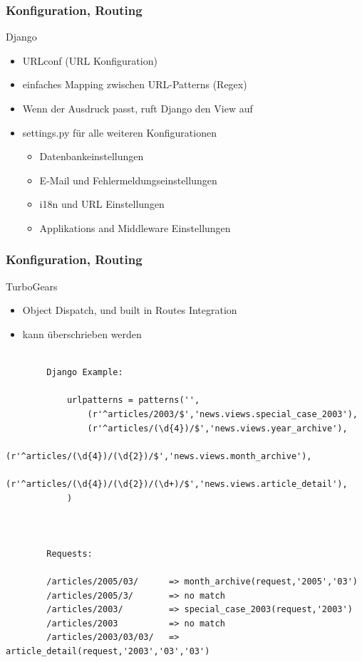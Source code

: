 \documentclass[
    t,
    smaller,
    compress,
]{beamer}
\begin{document}
\begin{frame}
  \frametitle{Konfiguration, Routing}
	Django
  	\begin{itemize}[<1->]
    	\item URLconf (URL Konfiguration)
    	\item einfaches Mapping zwischen URL-Patterns (Regex)
    	\item Wenn der Ausdruck passt, ruft Django den View auf
    	\item settings.py für alle weiteren Konfigurationen
    	\begin{itemize}[<1->]
    		\item Datenbankeinstellungen
    		\item E-Mail und Fehlermeldungseinstellungen
    		\item i18n und URL Einstellungen
    		\item Applikations and Middleware Einstellungen
    	\end{itemize}
  	 \end{itemize}
  	 
\end{frame}


\begin{frame}
  \frametitle{Konfiguration, Routing}
TurboGears
  	 \begin{itemize}[<1->]
    	\item Object Dispatch, und built in Routes Integration
    	\item kann überschrieben werden
 	\end{itemize}
\end{frame}  


	\begin{verbatim}
		
		Django Example:
	
			urlpatterns = patterns('',
				(r'^articles/2003/$','news.views.special_case_2003'),
				(r'^articles/(\d{4})/$','news.views.year_archive'),
				(r'^articles/(\d{4})/(\d{2})/$','news.views.month_archive'),
				(r'^articles/(\d{4})/(\d{2})/(\d+)/$','news.views.article_detail'),
			)
		
		
		
		Requests:
	
		/articles/2005/03/		=> month_archive(request,'2005','03')
		/articles/2005/3/		=> no match
		/articles/2003/			=> special_case_2003(request,'2003')
		/articles/2003			=> no match
		/articles/2003/03/03/	=> article_detail(request,'2003','03','03')
		
	\end{verbatim}
	
\end{document}
